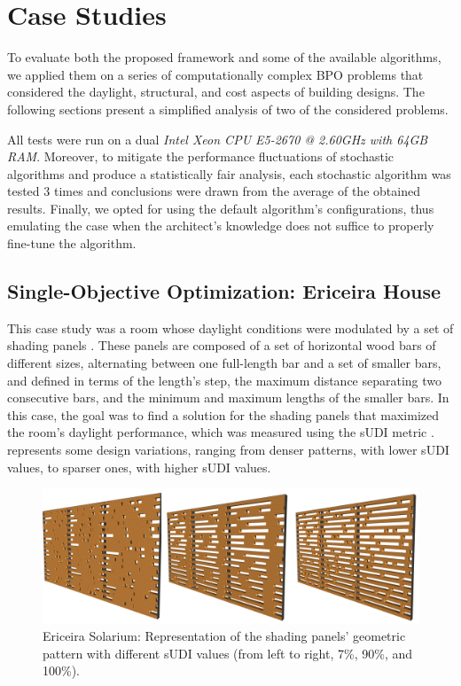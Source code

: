 \section{Case Studies}
\label{sec:resul}
To evaluate both the proposed framework and some of the available algorithms, we applied them on a series of computationally complex \ac{BPO} problems that considered the daylight, structural, and cost aspects of building designs. The following sections present a simplified analysis of two of the considered problems.

All tests were run on a dual \textit{Intel Xeon CPU E5-2670 @ 2.60GHz with 64GB RAM}. Moreover, to mitigate the performance fluctuations of stochastic algorithms and produce a statistically fair analysis, each stochastic algorithm was tested $3$ times and conclusions were drawn from the average of the obtained results. Finally, we opted for using the default algorithm's configurations, thus emulating the case when the architect's knowledge does not suffice to properly fine-tune the algorithm. 

\subsection{Single-Objective Optimization: Ericeira House}
This case study was a room whose daylight conditions were modulated by a set of shading panels \cite{Caetano2018}. These panels are composed of a set of horizontal wood bars of different sizes, alternating between one full-length bar and a set of smaller bars, and defined in terms of the length’s step, the maximum distance separating two consecutive bars, and the minimum and maximum lengths of the smaller bars. In this case, the goal was to find a solution for the shading panels that maximized the room's daylight performance, which was measured using the \ac{sUDI} metric \cite{Nabil2006}.   represents some design variations, ranging from denser patterns, with lower \ac{sUDI} values, to sparser ones, with higher \ac{sUDI} values.

\begin{figure}[htpb]
	\centering
	\includegraphics[width=\columnwidth]{../report/Images/Evaluation/ericeira_extended_abstract.png}
	\caption{Ericeira Solarium: Representation of the shading panels’ geometric pattern with different sUDI values (from left to right, 7\%, 90\%, and 100\%).}
	\label{fig:ericeira_multiple_panels}
\end{figure}

